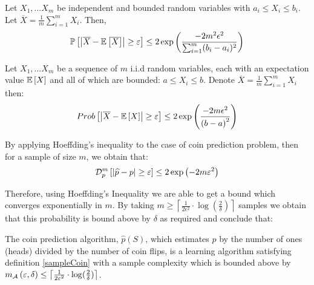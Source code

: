 \begin{theorem}
Let $X_1, \ldots X_m$ be independent and bounded random variables with $a_i \leq X_i \leq b_i$. Let $\overline{X} = \frac{1}{m} \sum_{i=1} ^m X_i$. Then,
$$\mathbb{P}  \left[ \left|\overline{X} - \mathbb{E}\left[\overline{X}\right]\right| \geq \varepsilon\right] \leq 2 \exp \left( \frac{-2m^2 \epsilon^2}{\sum _{i =1} ^m (b_i-a_i)^2} \right)$$
\end{theorem}

\begin{corollary}
Let $X_1, \ldots X_m$ be a sequence of $m$  i.i.d random variables, each with an expectation value $\mathbb{E}\left[X\right]$ and all of which are bounded: $a \leq X_i \leq b$. Denote $\overline{X} = \frac{1}{m} \sum_{i=1} ^m X_i$ then:$$ Prob  \left[\left|\overline{X} - \mathbb{E}\left[X\right]\right| \geq \varepsilon\right] \leq 2 \exp \left( \frac{-2 m \epsilon^2}{\left(b-a\right)^2} \right)$$
\end{corollary}


By applying Hoeffding's inequality to the case of coin prediction problem, then for a sample of size $m$, we obtain that:
$$ \mathcal{D}_p ^m \left[\left|\widehat{p}-p\right| \ge \varepsilon \right]\leq  2 \exp\left(-2 m \varepsilon ^2\right)$$

Therefore, using Hoeffding's Inequality we are able to get a bound which converges exponentially in $m$. By taking $m\ge \left \lceil \frac{1}{2\epsilon^2} \cdot \log(\frac{2}{\delta}) \right \rceil$ samples we obtain that this probability is bound above by $\delta$ as required and conclude that:
\begin{corollary}
The coin prediction algorithm, $\widehat{p}\left(S\right)$, which estimates $p$ by the number of ones (heads) divided by the number of coin flips, is a learning algorithm satisfying definition \autoref{sampleCoin} with a sample complexity which is bounded above by
	$m_{\mathcal{A}}\left(\varepsilon,\delta\right) \le \left \lceil \frac{1}{2\varepsilon^2} \cdot\log(\frac{2}{\delta}) \right \rceil$.
\end{corollary}






